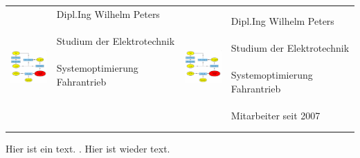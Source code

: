 \begin{tabular}{p{2.1cm}p{6cm}p{2cm}p{6cm}}
	\parbox[c]{2cm}{\includegraphics[width=2cm]{Bilder/toolkit.eps}} 	\hfill 	
	& \parbox[c]{5.9cm}{
			\Large Dipl.Ing Wilhelm Peters \normalsize \\
			\phantom{test}\\
			Studium der Elektrotechnik\\
			\\
			Systemoptimierung Fahrantrieb\\
			\\
			\phantom{test}\\
			\phantom{test}\\
		}	
		
	&	\parbox[c]{2cm}{\includegraphics[width=2cm]{Bilder/toolkit.eps}}  	\hfill 	
	& \parbox[c]{5.9cm}{
			\Large Dipl.Ing Wilhelm Peters \normalsize \\
			\phantom{test}\\
			Studium der Elektrotechnik\\
			\\
			Systemoptimierung Fahrantrieb\\
			\\
			Mitarbeiter seit 2007
			\\
		}\\
\end{tabular}

Hier ist ein text. \phantom{Und hier ist der Text als phantom}. Hier ist wieder text.